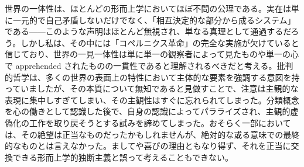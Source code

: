 \documentclass[a4paper,11pt,openany]{ltjsbook}
\begin{document}
世界の一体性は、ほとんどの形而上学においてほぼ不問の公理である。実在は単に一元的で自己矛盾しないだけでなく、「相互決定的な部分から成るシステム」である——このような声明はほとんど無視され、単なる真理として通過するだろう。しかし私は、その中には「コペルニクス革命」の完全な実施が欠けていると信じており、世界の一見一体性は単に単一の観察者によって見たものや単一の心で apprehended されたものの一貫性であると理解されるべきだと考える。批判的哲学は、多くの世界の表面上の特性において主体的な要素を強調する意図を持っていましたが、その本質について無知であると見做すことで、注意は主観的な表現に集中しすぎてしまい、その主観性はすぐに忘れられてしまった。分類概念を心の働きとして認識した後で、自身の認識によってパラライズされ、主観的虚偽化の工作を取り戻そうとする試みを諦めてしまった。おそらく一部においては、その絶望は正当なものだったかもしれませんが、絶対的な或る意味での最終的なものとは言えなかった。ましてや喜びの理由ともなり得ず、それを正当に交換できる形而上学的独断主義と誤って考えることもできない。
\end{document}
